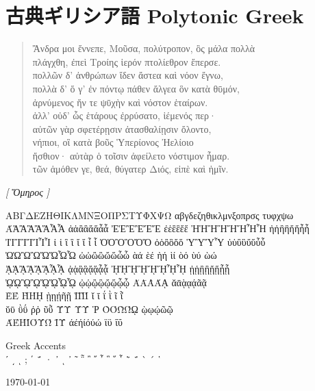 \documentclass[a4j]{ujarticle}
\begin{document}
\section{古典ギリシア語 \protect\textlatin{Polytonic Greek}}
\begin{verse}
Ἄνδρα μοι ἔννεπε, Μοῦσα, πολύτροπον, ὃς μάλα πολλὰ\\
πλάγχθη, ἐπεὶ Τροίης ἱερόν πτολίεθρον ἔπερσε.\\
πολλῶν δ’ ἀνθρώπων ἴδεν ἄστεα καὶ νόον ἔγνω,\\
πολλὰ δ’ ὅ γ’ ἐν πόντῳ πάθεν ἄλγεα ὃν κατὰ θῡμόν,\\
ἀρνύμενος ἥν τε ψῡχὴν καὶ νόστον ἑταίρων.\\
ἀλλ’ οὐδ’ ὧς ἑτάρους ἐρρύσατο, ἱέμενός περ·\\
αὐτῶν γὰρ σφετέρῃσιν ἀτασθαλίῃσιν ὄλοντο,\\
νήπιοι, οἳ κατὰ βοῦς Ὑπερίονος Ἠελίοιο\\
ἤσθιον· αὐτὰρ ὁ τοῖσιν ἀφείλετο νόστιμον ἦμαρ.\\
τῶν ἁμόθεν γε, θεά, θύγατερ Διός, εἰπὲ καὶ ἡμῖν.
\end{verse}

\hfill {\em [ \textit{Ὅμηρος} ]} \qquad\qquad

\vspace{1em}
ΑΒΓΔΕΖΗΘΙΚΛΜΝΞΟΠΡΣΤΥΦΧΨΩ 
αβγδεζηθικλμνξοπρσς τυφχψω\\
ΆἉἊἋἌἍἎἏ ἀἁἂἃἄἅἆἇ ἘἙἚἛἜἝ ἐἑἒἓἔἕ ἨἩἪἫἬἭἮἯ %
ἠἡἢἣἤἥἦἧ\\
ἸἹἺἻἼἽἾἿ ἰ ἱ ἲ ἳ ἴ ἵ ἶ ἷ ὈὉὊὋὌὍ ὀὁὂὃὄὅ ὙὛὝὟ %
ὐὑὒὓὔὕὖὗ\\
ὨὩὪὫὬὭὮὯ ὠὡὢὣὤὥὦὧ ὰά ὲέ ὴή ὶί ὸό ὺύ ὼώ\\
ᾈᾉᾊᾋᾌᾍᾎᾏ ᾀᾁᾂᾃᾄᾅᾆᾇ ᾘᾙᾚᾛᾜᾝᾞᾟ ᾐᾑᾒᾓᾔᾕᾖᾗ\\
ᾨᾩᾪᾫᾬᾭᾮᾯ ᾠᾡᾢᾣᾤᾥᾦᾧ ᾸᾹᾺΆᾼ ᾰᾱᾲᾳᾴᾶᾷ\\
ῈΈ ῊΉῌ ῂῃῄῆῇ ῘῙῚΊ ῐ ῑ ΐ ῒ ῖ ῗ\\
ῠῡ ῢΰ ῤῥ ῦῧ ῨῩ ῪΎ Ῥ ῸΌῺΏῼ ῲῳῴῶῷ\\
ΆΈΉΊΌΎΏ ΪΫ άέήίόύώ ϊϋ ΐΰ %


\textlatin{Greek Accents}\\
ʹ ͵ ͺ ; ΄ ΅ · ᾽ ι ᾽ ῀ ῁ ῍ ῎ ῏ ῝ ῞ ῟ ῭ ΅ ` ´ ῾ 

\hfill\today
\end{document}
